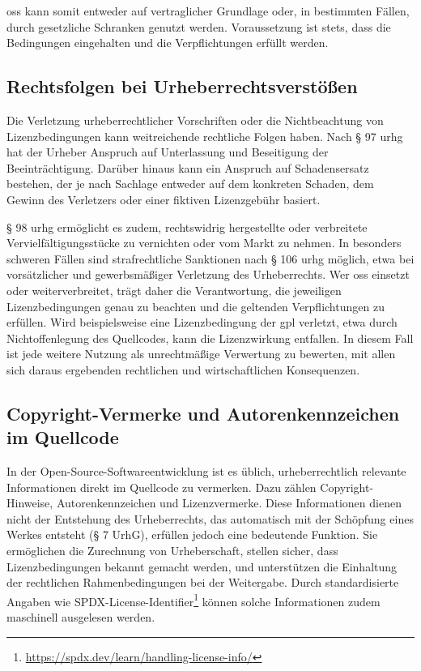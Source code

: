 \gls{oss} kann somit entweder auf vertraglicher Grundlage oder, in bestimmten Fällen, durch gesetzliche Schranken genutzt werden.
Voraussetzung ist stets, dass die Bedingungen eingehalten und die Verpflichtungen erfüllt werden.


\subsection{Rechtsfolgen bei Urheberrechtsverstößen}\label{subsec:rechtsfolgen-bei-urheberrechtsverstoen}

Die Verletzung urheberrechtlicher Vorschriften oder die Nichtbeachtung von Lizenzbedingungen kann weitreichende rechtliche Folgen haben.
Nach § 97 \gls{urhg} hat der Urheber Anspruch auf Unterlassung und Beseitigung der Beeinträchtigung.
Darüber hinaus kann ein Anspruch auf Schadensersatz bestehen, der je nach Sachlage entweder auf dem konkreten Schaden, dem Gewinn des Verletzers oder einer fiktiven Lizenzgebühr basiert.

§ 98 \gls{urhg} ermöglicht es zudem, rechtswidrig hergestellte oder verbreitete Vervielfältigungsstücke zu vernichten oder vom Markt zu nehmen.
In besonders schweren Fällen sind strafrechtliche Sanktionen nach § 106 \gls{urhg} möglich, etwa bei vorsätzlicher und gewerbsmäßiger Verletzung des Urheberrechts.
Wer \gls{oss} einsetzt oder weiterverbreitet, trägt daher die Verantwortung, die jeweiligen Lizenzbedingungen genau zu beachten und die geltenden Verpflichtungen zu erfüllen.
Wird beispielsweise eine Lizenzbedingung der \gls{gpl} verletzt, etwa durch Nichtoffenlegung des Quellcodes, kann die Lizenzwirkung entfallen.
In diesem Fall ist jede weitere Nutzung als unrechtmäßige Verwertung zu bewerten, mit allen sich daraus ergebenden rechtlichen und wirtschaftlichen Konsequenzen.


\subsection{Copyright-Vermerke und Autorenkennzeichen im Quellcode}

In der Open-Source-Softwareentwicklung ist es üblich, urheberrechtlich relevante Informationen direkt im Quellcode zu vermerken.
Dazu zählen Copyright-Hinweise, Autorenkennzeichen und Lizenzvermerke.
Diese Informationen dienen nicht der Entstehung des Urheberrechts, das automatisch mit der Schöpfung eines Werkes entsteht (§ 7 UrhG), erfüllen jedoch eine bedeutende Funktion.
Sie ermöglichen die Zurechnung von Urheberschaft, stellen sicher, dass Lizenzbedingungen bekannt gemacht werden, und unterstützen die Einhaltung der rechtlichen Rahmenbedingungen bei der Weitergabe.
Durch standardisierte Angaben wie SPDX-License-Identifier\footnote{\url{https://spdx.dev/learn/handling-license-info/}} können solche Informationen zudem maschinell ausgelesen werden.

